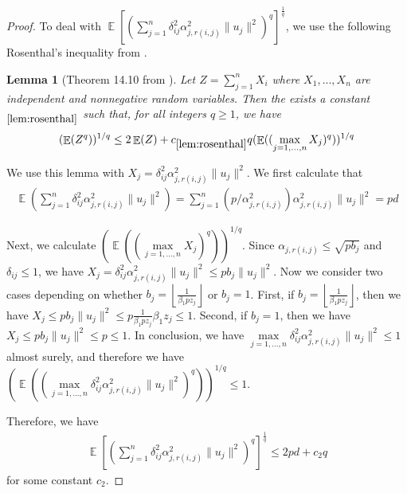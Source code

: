 \documentclass[11pt]{amsart}
\numberwithin{equation}{section}
\numberwithin{equation}{section}
\DeclareMathOperator{\E}{\mathbb{E}}
\newtheorem{lemma}[theorem]{Lemma}
\theoremstyle{remark}
\theoremstyle{definition}
\begin{document}
\begin{proof}
    To deal with $\E \left[ \left ( \sum_{j=1}^n \delta_{ij}^2 \alpha_{j,r(i,j)}^2 \| u_j \| ^2 \right)^q \right]^\frac{1}{q}$, we use the following Rosenthal’s inequality from \cite[p.442]{boucheron2013concentration}.

\begin{lemma}[Theorem 14.10 from \cite{boucheron2013concentration}]\label{lem:rosenthal}
Let $Z=\sum_{j=1}^nX_i$ where $X_1,...,X_n$ are independent and nonnegative random variables. Then the exists a constant $_{\ref{lem:rosenthal}}$ such that, for all integers $q \ge 1$, we have
\begin{align*}
    (\E (Z^q))^{1/q} \le 2 \E( Z)+ c_{\ref*{lem:rosenthal}}q (\E ((\max \limits_{j=1,...,n} X_j)^q))^{1/q}
\end{align*}
\end{lemma}

We use this lemma with $X_j=\delta_{ij}^2 \alpha_{j,r(i,j)}^2 \| u_j \| ^2$. We first calculate that
\begin{align*}
    \E (\sum_{j=1}^n \delta_{ij}^2 \alpha_{j,r(i,j)}^2 \| u_j \| ^2) = \sum_{j=1}^n (p/\alpha_{j,r(i,j)}^2)\alpha_{j,r(i,j)}^2\| u_j \| ^2 =pd
\end{align*}

Next, we calculate $(\E ((\max \limits_{j=1,...,n} X_j)^q))^{1/q}$. Since $\alpha_{j,r(i,j)} \le \sqrt{pb_j}$ and $\delta_{ij} \le 1$, we have $X_j=\delta_{ij}^2 \alpha_{j,r(i,j)}^2 \| u_j \| ^2 \le pb_j \| u_j \| ^2$. Now we consider two cases depending on whether $b_j=\left\lfloor \frac{1}{\beta_1pz_j} \right\rfloor$ or $b_j=1$. First, if $b_j=\left\lfloor \frac{1}{\beta_1pz_j} \right\rfloor$, then we have $X_j \le pb_j \| u_j \| ^2 \le p \frac{1}{\beta_1pz_j} \beta_1z_j \le 1$. Second, if $b_j=1$, then we have $X_j \le pb_j \| u_j \| ^2 \le p  \le 1$. In conclusion, we have $\max \limits_{j=1,...,n} \delta_{ij}^2 \alpha_{j,r(i,j)}^2 \| u_j \| ^2 \le 1$ almost surely, and therefore we have $(\E ((\max \limits_{j=1,...,n} \delta_{ij}^2 \alpha_{j,r(i,j)}^2 \| u_j \| ^2)^q))^{1/q} \le 1$.

Therefore, we have
\begin{align*}
    \E \left[ \left ( \sum_{j=1}^n \delta_{ij}^2 \alpha_{j,r(i,j)}^2 \| u_j \| ^2 \right)^q \right]^\frac{1}{q} \le 2pd+c_2q
\end{align*}
for some constant $c_2$.


\end{proof}
\end{document}
